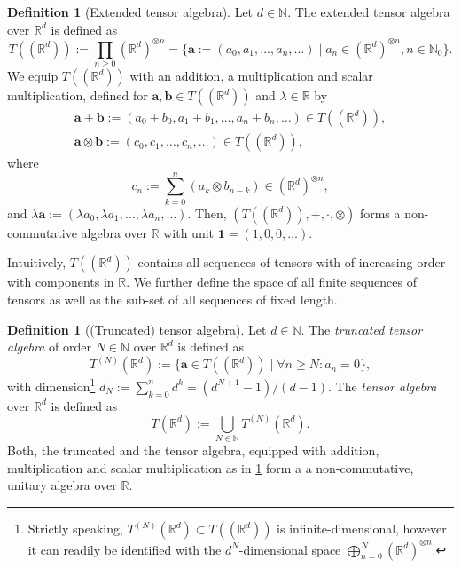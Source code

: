 \documentclass[
    a4paper,
    11pt,
    bibliography=totoc,
    listof=totoc,      
    headinclude=true,
    cleardoublepage=empty,
]{scrbook}
\theoremstyle{plain}
\theoremstyle{definition}
\newtheorem{definition}[theorem]{Definition}
\theoremstyle{remark}
\newcommand{\SetR}{\mathbb R}
\newcommand{\SetN}{\mathbb N}
\begin{document}
\begin{definition}[Extended tensor algebra]
\label{def:ExtendedTensorAlgebra}
    Let $d\in\SetN$. The extended tensor algebra over $\SetR^d$ is defined as
    \[
        T((\SetR^d)) := \prod_{n\geq 0} (\SetR^d)^{\otimes n}
        = \{\bm{a} := (a_0,a_1,\dots, a_n,\dots) 
            \mid a_n\in(\SetR^d)^{\otimes n}, n\in \SetN_0\}.
    \]
    We equip $T((\SetR^d))$ with an addition, a multiplication and scalar 
    multiplication, defined for $\bm{a}, \bm{b} \in T((\SetR^d))$ and 
    $\lambda\in\SetR$ by
    \begin{gather*}
        \bm{a} + \bm{b} := (a_0+b_0, a_1+b_1, \dots, a_n+b_n,\dots) 
            \in T((\SetR^d)), \\
        \bm{a} \otimes \bm{b} := (c_0, c_1, \dots, c_n, \dots ) 
            \in T((\SetR^d)),        
    \end{gather*}
    where
    \[
        c_n := \sum_{k=0}^n (a_k \otimes b_{n-k}) \in (\SetR^d)^{\otimes n},
    \]
    and $\lambda \bm{a} := (\lambda a_0, \lambda a_1, \dots, \lambda a_n, 
    \dots)$. Then, $(T((\SetR^d)), +, \cdot, \otimes)$ forms a non-commutative 
    algebra over $\SetR$ with unit $\bm{1} = (1,0,0, \dots)$.
\end{definition}

Intuitively, $T((\SetR^d))$ contains all sequences of tensors with of 
increasing order with components in $\SetR$. We further define the space 
of all finite sequences of tensors as well as the sub-set of all sequences of
fixed length.

\begin{definition}[(Truncated) tensor algebra]
\label{def:TensorAlgebra}
    Let $d\in\SetN$. The \textit{truncated tensor algebra} of order 
    $N\in\SetN$ over $\SetR^d$ is defined as
    \[
        T^{(N)}(\SetR^d) := \{\bm{a} \in T((\SetR^d))
            \mid \forall n\geq N: a_n = 0\},        
    \]
    with dimension\footnote{
        Strictly speaking, $T^{(N)}(\SetR^d)\subset T((\SetR^d))$ is 
        infinite-dimensional, however it can readily be identified with the 
        $d^N$-dimensional space $\bigoplus_{n=0}^N(\SetR^d)^{\otimes n}$.
    } 
    $d_N := \sum_{k=0}^n d^k = (d^{N+1} - 1) / (d-1)$. The \textit{tensor 
    algebra} over $\SetR^d$ is defined as
    \[
        T(\SetR^d) := \bigcup_{N\in\SetN} T^{(N)}(\SetR^d).
    \]
    Both, the truncated and the tensor algebra, equipped with addition, 
    multiplication and scalar multiplication as in
    \cref{def:ExtendedTensorAlgebra} form a a non-commutative, unitary algebra
    over $\SetR$.    
\end{definition}
\end{document}
